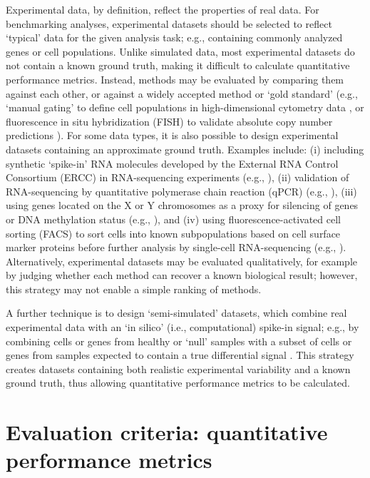 \documentclass[12pt, a4paper]{article}
\begin{document}
Experimental data, by definition, reflect the properties of real data. For benchmarking analyses, experimental datasets should be selected to reflect `typical' data for the given analysis task; e.g., containing commonly analyzed genes or cell populations. Unlike simulated data, most experimental datasets do not contain a known ground truth, making it difficult to calculate quantitative performance metrics. Instead, methods may be evaluated by comparing them against each other, or against a widely accepted method or `gold standard' (e.g., `manual gating' to define cell populations in high-dimensional cytometry data \citep{Weber2016, Aghaeepour2013}, or fluorescence in situ hybridization (FISH) to validate absolute copy number predictions \citep{Zheng2017}). For some data types, it is also possible to design experimental datasets containing an approximate ground truth. Examples include: (i) including synthetic `spike-in' RNA molecules developed by the External RNA Control Consortium (ERCC) \citep{Jiang2011} in RNA-sequencing experiments (e.g., \citep{Garalde2018, SEQCMAQCIII2014}), (ii) validation of RNA-sequencing by quantitative polymerase chain reaction (qPCR) (e.g., \citep{SEQCMAQCIII2014}), (iii) using genes located on the X or Y chromosomes as a proxy for silencing of genes or DNA methylation status (e.g., \citep{Law2014, Fang2012}), and (iv) using fluorescence-activated cell sorting (FACS) to sort cells into known subpopulations based on cell surface marker proteins before further analysis by single-cell RNA-sequencing (e.g., \citep{TabulaMuris2018}). Alternatively, experimental datasets may be evaluated qualitatively, for example by judging whether each method can recover a known biological result; however, this strategy may not enable a simple ranking of methods.

A further technique is to design `semi-simulated' datasets, which combine real experimental data with an `in silico' (i.e., computational) spike-in signal; e.g., by combining cells or genes from healthy or `null' samples with a subset of cells or genes from samples expected to contain a true differential signal \citep{Arvaniti2017, Weber2018, Rigaill2018}. This strategy creates datasets containing both realistic experimental variability and a known ground truth, thus allowing quantitative performance metrics to be calculated.




\section*{Evaluation criteria: quantitative performance metrics}
\end{document}
